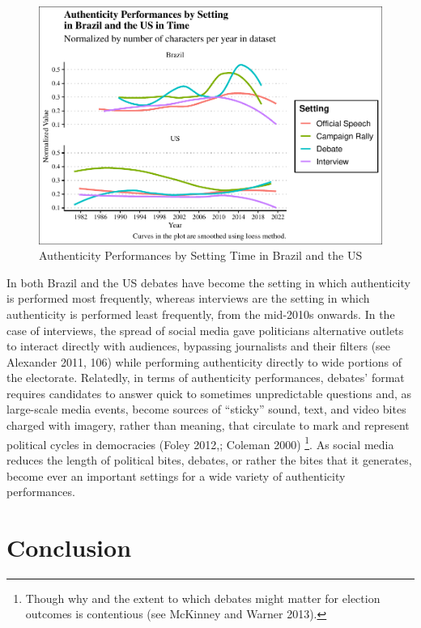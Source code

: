 \documentclass[smallextended]{svjour3}       %
\begin{document}
\begin{figure}
\centering
\includegraphics{antipc_files/figure-latex/Figure 4-1.pdf}
\caption{Authenticity Performances by Setting Time in Brazil and the US}
\end{figure}

In both Brazil and the US debates have become the setting in which
authenticity is performed most frequently, whereas interviews are the
setting in which authenticity is performed least frequently, from the
mid-2010s onwards. In the case of interviews, the spread of social media
gave politicians alternative outlets to interact directly with
audiences, bypassing journalists and their filters (see Alexander 2011,
106) while performing authenticity directly to wide portions of the
electorate. Relatedly, in terms of authenticity performances, debates'
format requires candidates to answer quick to sometimes unpredictable
questions and, as large-scale media events, become sources of ``sticky''
sound, text, and video bites charged with imagery, rather than meaning,
that circulate to mark and represent political cycles in democracies
(Foley 2012,; Coleman 2000) \footnote{Though why and the extent to which
  debates might matter for election outcomes is contentious (see
  McKinney and Warner 2013).}. As social media reduces the length of
political bites, debates, or rather the bites that it generates, become
ever an important settings for a wide variety of authenticity
performances.

\hypertarget{conclusion}{%
\section{Conclusion}\label{conclusion}}
\end{document}
